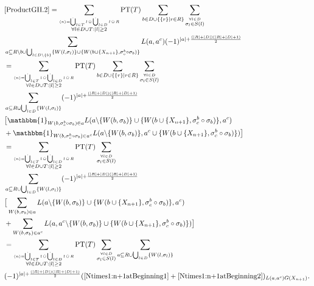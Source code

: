 \documentclass[b5paper,draft,openbib,12pt]{memoir}
\newcommand{\id}{\mathbbm{1}}
\DeclareMathOperator{\dotCup}{\mathop{\dot{\bigcup}}}
\DeclareMathOperator{\dotcup}{\mathop{\dot{\cup}}}
\begin{document}
\begin{align}\notag
&\eqref{ProductGII.2}=\sum_{\stackrel{\langle n \rangle = \dotCup_{l\in T}l \dotcup \dotCup_{l\in D}l \dotcup R}{\forall l \in D\cup T: |l|\ge 2}} \text{PT}(T) \sum_{b\in D \cup \{\{r\}\mid r \in R\}} \sum_{\stackrel{\forall l \in D}{\sigma_l \in S(l)}}\\\notag
 &\sum_{a \subseteq R\backslash b \cup \bigcup_{l \in D\backslash \{b\}}\{W(l,\sigma_l)\} \cup \{W(b\cup \{X_{n+1}\},\sigma^b_c\circ \sigma_b)\}} L(a,a^c) (-1)^{|a|+ \frac{(|R|+|D|)(|R|+|D|+1)}{2}}\\\notag
 &=\sum_{\stackrel{\langle n \rangle = \dotCup_{l\in T}l \dotcup \dotCup_{l\in D}l \dotcup R}{\forall l \in D\cup T: |l|\ge 2}} \text{PT}(T) \sum_{b\in D \cup \{\{r\}\mid r \in R\}} \sum_{\stackrel{\forall l \in D}{\sigma_l \in S(l)}} \\\notag
 &\sum_{a \subseteq R \cup \bigcup_{l \in D}\{W(l,\sigma_l)\}} (-1)^{|a|+ \frac{(|R|+|D|)(|R|+|D|+1)}{2}} \\\notag
& \big[ \id_{W(b,\sigma^b_c\circ\sigma_b)\in a} L(a\backslash \{W(b,\sigma_b)\} \cup \{W(b\cup \{X_{n+1}\},\sigma^b_c \circ\sigma_b)\},a^c) \\\notag
& +\id_{W(b,\sigma^b_c\circ \sigma_b)\in a^c} L(a\backslash \{W(b,\sigma_b)\},a^c \cup \{W(b\cup \{X_{n+1}\},\sigma^b_c \circ \sigma_b)\}) \big]\\\notag
&=\sum_{\stackrel{\langle n \rangle = \dotCup_{l\in T}l \dotcup \dotCup_{l\in D}l \dotcup R}{\forall l \in D\cup T: |l|\ge 2}} \text{PT}(T)  \sum_{\stackrel{\forall l \in D}{\sigma_l \in S(l)}} \\\notag
 &\sum_{a \subseteq R \cup \bigcup_{l \in D}\{W(l,\sigma_l)\}} (-1)^{|a|+ \frac{(|R|+|D|)(|R|+|D|+1)}{2}}
  \\\notag
& \big[ \sum_{W(b,\sigma_b) \in a }L(a\backslash \{W(b,\sigma_b)\} \cup \{W(b\cup \{X_{n+1}\},\sigma^b_c \circ\sigma_b)\},a^c) \\\notag
&+  \sum_{W(b,\sigma_b) \in a^c } L(a,a^c \backslash \{W(b,\sigma_b)\} \cup \{W(b\cup \{X_{n+1}\},\sigma^b_c \circ \sigma_b)\}) \big]\\\notag
&=\sum_{\stackrel{\langle n \rangle = \dotCup_{l\in T}l \dotcup \dotCup_{l\in D}l \dotcup R}{\forall l \in D\cup T: |l|\ge 2}} \text{PT}(T)  \sum_{\stackrel{\forall l \in D}{\sigma_l \in S(l)}} \sum_{a \subseteq R \cup \bigcup_{l \in D}\{W(l,\sigma_l)\}} \\
 & (-1)^{|a|+ \frac{(|R|+|D|)(|R|+|D|+1)}{2}}
 (\eqref{Ntimes1:n+1atBeginning1}+\eqref{Ntimes1:n+1atBeginning2})_{L(a,a^c)G(X_{n+1})}.
\end{align}
\end{document}
